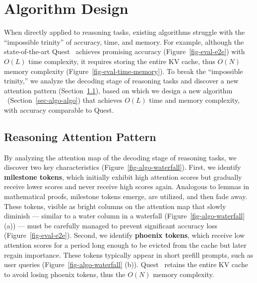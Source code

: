 \section{Algorithm Design}
\label{sec-algo}

When directly applied to reasoning tasks, existing algorithms struggle with the ``impossible trinity'' of accuracy, time, and memory. For example, although the state-of-the-art Quest~\cite{tang2024quest} achieves promising accuracy (Figure~\ref{fig-eval-e2e}) with $O(L)$ time complexity, it requires storing the entire KV cache, thus $O(N)$ memory complexity (Figure~\ref{fig-eval-time-memory}). To break the ``impossible trinity,'' we analyze the decoding stage of reasoning tasks and discover a new attention pattern (Section~\ref{sec-algo-pattern}), based on which we design a new algorithm \algo\ (Section~\ref{sec-algo-algo}) that achieves $O(L)$ time and memory complexity, with accuracy comparable to Quest.


\subsection{Reasoning Attention Pattern}
\label{sec-algo-pattern}


By analyzing the attention map of the decoding stage of reasoning tasks, we discover two key characteristics (Figure~\ref{fig-algo-waterfall}). First, we identify \textbf{milestone tokens}, which initially exhibit high attention scores but gradually receive lower scores and never receive high scores again. Analogous to lemmas in mathematical proofs, milestone tokens emerge, are utilized, and then fade away. These tokens, visible as bright columns on the attention map that slowly diminish --- similar to a water column in a waterfall (Figure~\ref{fig-algo-waterfall} (a)) --- must be carefully managed to prevent significant accuracy loss (Figure~\ref{fig-eval-e2e}). Second, we identify \textbf{phoenix tokens}, which receive low attention scores for a period long enough to be evicted from the cache but later regain importance. These tokens typically appear in short prefill prompts, such as user queries (Figure~\ref{fig-algo-waterfall} (b)). Quest~\cite{tang2024quest} retains the entire KV cache to avoid losing phoenix tokens, thus the $O(N)$ memory complexity.


